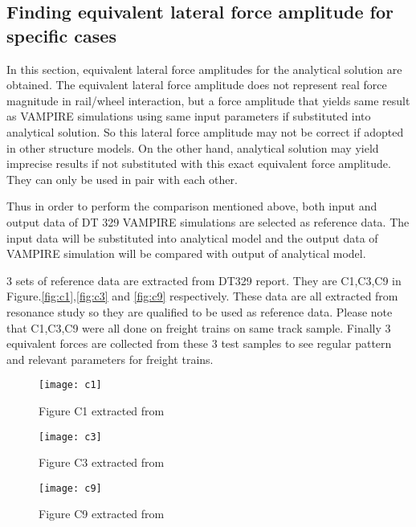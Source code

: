 \subsection{Finding equivalent lateral force amplitude for specific cases}\label{sec:findingequivalentamplitude}
In this section, equivalent lateral force amplitudes for the analytical solution are obtained. The equivalent lateral force amplitude does not represent real force magnitude in rail/wheel interaction, but a force amplitude that yields same result as VAMPIRE simulations using same input parameters if substituted into analytical solution. So this lateral force amplitude may not be correct if adopted in other structure models. On the other hand, analytical solution may yield imprecise results if not substituted with this exact equivalent force amplitude. They can only be used in pair with each other.

Thus in order to perform the comparison mentioned above, both input and output data of DT 329 VAMPIRE simulations are selected as reference data. The input data will be substituted into analytical model and the output data of VAMPIRE simulation will be compared with output of analytical model. 

3 sets of reference data are extracted from DT329 report. They are C1,C3,C9 in Figure.\ref{fig:c1},\ref{fig:c3} and \ref{fig:c9} respectively. These data are all extracted from resonance study so they are qualified to be used as reference data. Please note that C1,C3,C9 were all done on freight trains on same track sample. Finally 3 equivalent forces are collected from these 3 test samples to see regular pattern and relevant parameters for freight trains.

\begin{figure}[h!]
    \centering
    \texttt{[image: c1]}
    \caption{Figure C1 extracted from \citet{d181dt329} }
\end{figure}

\begin{figure}[h!]
    \centering
    \texttt{[image: c3]}
    \caption{Figure C3 extracted from \citet{d181dt329} }
\end{figure}

\begin{figure}[h!]
    \centering
    \texttt{[image: c9]}
    \caption{Figure C9 extracted from \citet{d181dt329} }
\end{figure}

